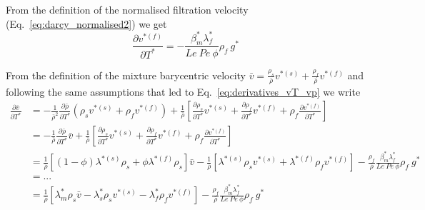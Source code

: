 \documentclass[]{scrreprt}
\begin{document}
From the definition of the normalised filtration velocity (Eq.~\ref{eq:darcy_normalised2}) we get
\begin{equation}
  \frac{\partial v^{*(f)}}{\partial T^*} = -\frac{\beta^*_m \lambda^*_f}{Le\:Pe\:\phi}\rho_f\:g^*
\end{equation}

From the definition of the mixture barycentric velocity $\bar{v} = \frac{\rho_s}{\bar{\rho}} v^{*(s)} + \frac{\rho_f}{\bar{\rho}} v^{*(f)}$ and following the same assumptions that led to Eq.~\ref{eq:derivatives_vT_vp} we write
\begin{subequations}
  \begin{align}
  \frac{\partial \bar{v}}{\partial T^*} &= -\frac{1}{\bar{\rho}^2}\frac{\partial \bar{\rho}}{\partial T^*} (\rho_s v^{*(s)} + \rho_f v^{*(f)}) + \frac{1}{\bar{\rho}} \left[ \frac{\partial \rho_s}{\partial T^*}v^{*(s)} +\frac{\partial \rho_f}{\partial T^*}v^{*(f)} +\rho_f\frac{\partial v^{*(f)}}{\partial T^*}  \right]\\ \nonumber
  &= -\frac{1}{\bar{\rho}}\frac{\partial \bar{\rho}}{\partial T^*}\bar{v} + \frac{1}{\bar{\rho}} \left[ \frac{\partial \rho_s}{\partial T^*}v^{*(s)} +\frac{\partial \rho_f}{\partial T^*}v^{*(f)} +\rho_f\frac{\partial v^{*(f)}}{\partial T^*}  \right]\\ \nonumber
  &= \frac{1}{\bar{\rho}}\left[(1-\phi)\lambda^{*(s)}\rho_s + \phi\lambda^{*(f)}\rho_s \right]\bar{v} - \frac{1}{\bar{\rho}} \left[ \lambda^{*(s)}\rho_s v^{*(s)} + \lambda^{*(f)}\rho_f v^{*(f)} \right] - \frac{\rho_f}{\bar{\rho}}\frac{\beta^*_m \lambda^*_f}{Le\:Pe\:\phi}\rho_f\:g^*  \\ \nonumber
  &= ... \\ \nonumber
  &= \frac{1}{\bar{\rho}}\left[ \lambda^*_m \rho_s \bar{v} - \lambda^*_s \rho_s v^{*(s)} - \lambda^*_f \rho_f v^{*(f)}    \right] - \frac{\rho_f}{\bar{\rho}}\frac{\beta^*_m \lambda^*_f}{Le\:Pe\:\phi}\rho_f\:g^*  \\ \nonumber
  \end{align}
\end{subequations}
\end{document}
